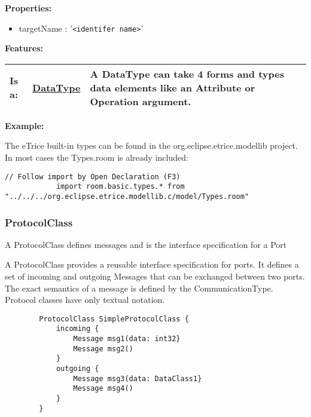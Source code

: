 		
		\textbf{Properties:}
		\begin{itemize}
		\item targetName : '\verb|<identifer name>|'
		\end{itemize}
		
		\begingroup
		\textbf{Features:}
		\renewcommand{\arraystretch}{1.8} %
		\begin{longtable}{l|l p{}}
			\hline
		Is a: & \tabitem \hyperlink{ref:DataType}{DataType}  & A DataType can take 4 forms and types data elements like an Attribute or Operation argument.\\
		\hline
		\end{longtable}
		\endgroup
		
		
		\textbf{Example:}
		
			The eTrice built-in types can be found in the \textsf{org.eclipse.etrice.modellib} project. In most cases the \textsf{Types.room} is already included:
			\begin{lstlisting}[language=ROOM]
			// Follow import by Open Declaration (F3)
			import room.basic.types.* from "../../../org.eclipse.etrice.modellib.c/model/Types.room"
			\end{lstlisting}
	
	\vspace{\baselineskip}
	\vspace{\baselineskip}
	\vspace{\baselineskip}
	
	\subsubsection{ProtocolClass}
		\hypertarget{ref:ProtocolClass}{}
		
		A ProtocolClass defines messages and is the interface specification for a Port
		
		A ProtocolClass provides a reusable interface specification for ports. It defines a set of incoming and outgoing Messages that can be exchanged between two ports.
		The exact semantics of a message is defined by the CommunicationType.
		Protocol classes have only textual notation.
		
		\begin{lstlisting}
		ProtocolClass SimpleProtocolClass {
			incoming {
				Message msg1(data: int32}
				Message msg2()
			}
			outgoing {
				Message msg3(data: DataClass1}
				Message msg4()
			}
		}
		\end{lstlisting}
		
